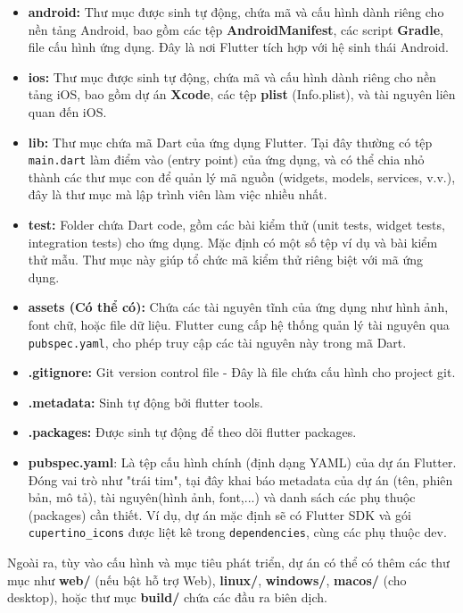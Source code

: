 \documentclass[../DoAn.tex]{subfiles}
\numberwithin{figure}{chapter}
\begin{document}
\begin{itemize}
\item \textbf{{android:}} Thư mục được sinh tự động, chứa mã và cấu hình dành riêng cho nền tảng Android, bao gồm các tệp \textbf{AndroidManifest}, các script \textbf{Gradle}, file cấu hình ứng dụng. Đây là nơi Flutter tích hợp với hệ sinh thái Android.
\item \textbf{{ios:}} Thư mục được sinh tự động, chứa mã và cấu hình dành riêng cho nền tảng iOS, bao gồm dự án \textbf{Xcode}, các tệp \textbf{plist} (Info.plist), và tài nguyên liên quan đến iOS.
\item \textbf{lib:} Thư mục chứa mã Dart của ứng dụng Flutter. Tại đây thường có tệp \texttt{main.dart} làm điểm vào (entry point) của ứng dụng, và có thể chia nhỏ thành các thư mục con để quản lý mã nguồn (widgets, models, services, v.v.), đây là thư mục mà lập trình viên làm việc nhiều nhất.
\item \textbf{{test:}} Folder chứa Dart code, gồm các bài kiểm thử (unit tests, widget tests, integration tests) cho ứng dụng. Mặc định có một số tệp ví dụ và bài kiểm thử mẫu. Thư mục này giúp tổ chức mã kiểm thử riêng biệt với mã ứng dụng.
\item \textbf{{assets (Có thể có):}} Chứa các tài nguyên tĩnh của ứng dụng như hình ảnh, font chữ, hoặc file dữ liệu. Flutter cung cấp hệ thống quản lý tài nguyên qua \texttt{pubspec.yaml}, cho phép truy cập các tài nguyên này trong mã Dart.
\item \textbf{.gitignore:} Git version control file - Đây là file chứa cấu hình cho project git.
\item \textbf{.metadata: } Sinh tự động bởi flutter tools.
\item \textbf{.packages: } Được sinh tự động để theo dõi flutter packages.
\item \textbf{{pubspec.yaml}}: Là tệp cấu hình chính (định dạng YAML) của dự án Flutter. Đóng vai trò như "trái tim", tại đây khai báo metadata của dự án (tên, phiên bản, mô tả), tài nguyên(hình ảnh, font,...) và danh sách các phụ thuộc (packages) cần thiết. Ví dụ, dự án mặc định sẽ có Flutter SDK và gói \texttt{cupertino\_icons} được liệt kê trong \texttt{dependencies}, cùng các phụ thuộc dev.
\end{itemize}

Ngoài ra, tùy vào cấu hình và mục tiêu phát triển, dự án có thể có thêm các thư mục như \textbf{web/} (nếu bật hỗ trợ Web), \textbf{linux/}, \textbf{windows/}, \textbf{macos/} (cho desktop), hoặc thư mục \textbf{build/} chứa các đầu ra biên dịch.
\end{document}

